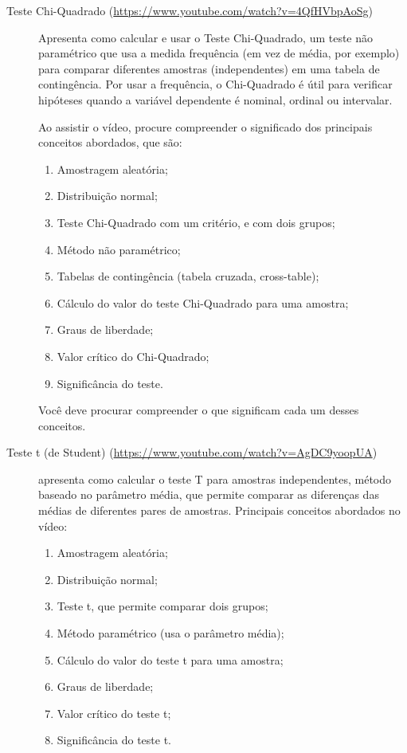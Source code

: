 \begin{description}
\item [Teste Chi-Quadrado (\url{https://www.youtube.com/watch?v=4QfHVbpAoSg})] Apresenta como calcular e usar o Teste Chi-Quadrado, um teste não paramétrico que usa a medida frequência (em vez de média, por exemplo) para comparar diferentes amostras (independentes) em uma tabela de contingência. Por usar a frequência, o Chi-Quadrado é útil para verificar hipóteses quando a variável dependente é nominal, ordinal ou intervalar. 

Ao assistir o vídeo, procure compreender o significado dos principais conceitos abordados, que são:
\begin{enumerate}
    \item Amostragem aleatória;
    \item Distribuição normal;
    \item Teste Chi-Quadrado com um critério, e com dois grupos;
    \item Método não paramétrico;
    \item Tabelas de contingência (tabela cruzada, cross-table);
    \item Cálculo do valor do teste Chi-Quadrado para uma amostra;
    \item Graus de liberdade;
    \item Valor crítico do Chi-Quadrado;
    \item Significância do teste.
\end{enumerate}
Você deve procurar compreender o que significam cada um desses conceitos.
\item [Teste t (de Student) (\url{https://www.youtube.com/watch?v=AgDC9yoopUA})] apresenta como calcular o teste T para amostras independentes, método baseado no parâmetro média, que permite comparar as diferenças das médias de diferentes pares de amostras.
Principais conceitos abordados no vídeo:
\begin{enumerate}
    \item Amostragem aleatória;
    \item Distribuição normal;
    \item Teste t, que permite comparar dois grupos;
    \item Método paramétrico (usa o parâmetro média);
    \item Cálculo do valor do teste t para uma amostra;
    \item Graus de liberdade;
    \item Valor crítico do teste t;
    \item Significância do teste t.
\end{enumerate}


\end{description}
